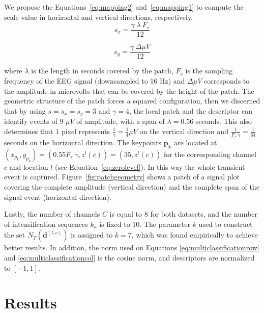 \documentclass[utf8]{frontiersSCNS} %
\begin{document}
We propose the Equations~\ref{eq:mapping2} and~\ref{eq:mapping1} to compute the scale value in horizontal and vertical directions, respectively. 
\begin{equation}
s_x = \frac{ \gamma \;  \lambda \  F_s}{12}
\label{eq:mapping2}
\end{equation}

\begin{equation}
s_y= \frac{\gamma \; \Delta \mu V}{12} 
\label{eq:mapping1}
\end{equation}

\noindent where $ \lambda $ is the length in seconds covered by the patch, $ F_s $ is the sampling frequency of the EEG signal (downsampled to 16 Hz) and  $\Delta  \mu V $ corresponds to the amplitude in microvolts that can be covered by the height of the patch. The geometric structure of the patch forces a squared configuration, then we discerned that by using $ s =s_x =s_y = 3 $ and $ \gamma = 4 $,  the local patch and the descriptor can identify events of 9 $ \mu V $ of amplitude, with a span of $ \lambda = 0.56$ seconds.  This also determines that $ 1 $ pixel represents $ \frac{1}{\gamma}= \frac{1}{4} \mu V $ on the vertical direction and $\frac{1}{F_s \ \gamma}=\frac{1}{64}$ seconds on the horizontal direction. The keypoints  $\mathbf{p_k}$  are located at $ (x_{p_k}, y_{p_k} )= ( 0.55 F_s \ \gamma, z^l(c) )= (35,  z^l(c)) $ for the corresponding channel $c$ and location $l$ (see Equation~\ref{eq:zerolevel}).   In this way the whole transient event is captured. 
Figure~\ref{fig:patchgeometry} shows a patch of a signal plot covering the complete amplitude (vertical direction) and the complete span of the signal event (horizontal direction). 

Lastly, the number of channels $C$ is equal to $8$ for both datasets, and the number of intensification sequences $k_a$ is fixed to $10$.  The parameter $k$ used to construct the set $N_T(\mathbf{d}^{(l,c)})$ is assigned to $k=7$, which was found empirically to achieve better results.  In addition, the norm used on  Equations \ref{eq:multiclassificationrow} and \ref{eq:multiclassificationcol} is the cosine norm, and descriptors are normalized to $ \left[ -1, 1 \right] $.

\section{Results} \label{Results}
\label{section:results}
\end{document}
